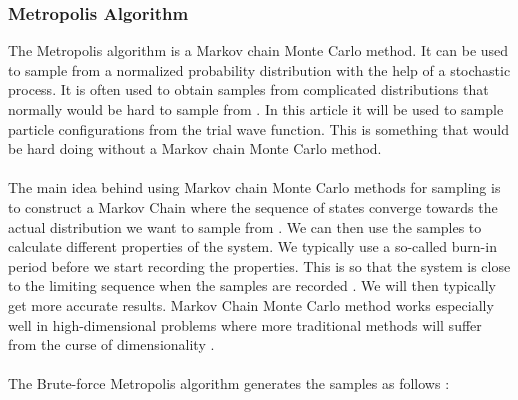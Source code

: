 \subsubsection{Metropolis Algorithm}
The Metropolis algorithm is a Markov chain Monte Carlo method.
It can be used to sample from a normalized probability distribution with the help of a stochastic process. It is often used to obtain samples from complicated distributions that normally would be hard to sample from \cite{compstat}. In this article it will be used to sample particle configurations from the trial wave function. This is something that would be hard doing without a Markov chain Monte Carlo method. 
\\
\\
The main idea behind using Markov chain Monte Carlo methods for sampling is to construct a Markov Chain where the sequence of states converge towards the actual distribution we want to sample from \cite{compstat}. We can then use the samples to calculate different properties of the system. We typically use a so-called burn-in period before we start recording the properties. This is so that the system is close to the limiting sequence when the samples are recorded \cite{compstat}. We will then typically get more accurate results. Markov Chain Monte Carlo method works especially well in high-dimensional problems where more traditional methods will suffer from the curse of dimensionality \cite{compstat}. 
\\
\\
The Brute-force Metropolis algorithm generates the samples as follows \cite{mhj}:
